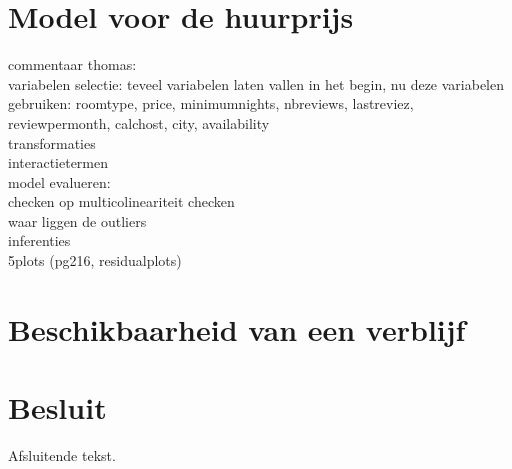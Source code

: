 \documentclass[a4paper,kulak]{kulakarticle} %
\begin{document}
\section{Model voor de huurprijs}
commentaar thomas:\\
variabelen selectie: teveel variabelen laten vallen in het begin, nu deze variabelen gebruiken: roomtype, price, minimumnights, nbreviews, lastreviez, reviewpermonth, calchost, city, availability \\
transformaties\\
interactietermen\\

model evalueren:\\
checken op multicolineariteit checken\\
waar liggen de outliers\\
inferenties\\
5plots (pg216, residualplots)

\section{Beschikbaarheid van een verblijf}


\section*{Besluit}

Afsluitende tekst.
\end{document}
